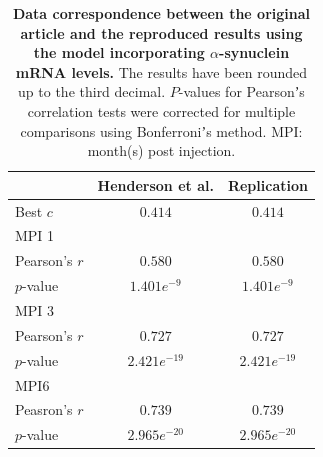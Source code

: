 \begin{table}[h]
  \begin{center}
    \centering
   
    \begin{tabular}{|l|c|c|} %
      \hline
      
      &\textbf{Henderson et al.} & \textbf{Replication} \hspace{1cm}\\

      \hline
      Best $c$ & $0.414$ & $0.414$ \\
      MPI 1 & &\\
            \hspace{1cm} Pearson's $r$ & $0.580$ & $0.580$\\
            \hspace{1cm} $p$-value & $1.401e^{-9}$ & $1.401e^{-9}$ \\ 

      MPI 3 & &\\
            \hspace{1cm} Pearson's $r$ & $0.727$ & $0.727$ \\
            \hspace{1cm} $p$-value & $2.421e^{-19}$ & $2.421e^{-19}$   \\
            
      MPI6& &\\
            \hspace{1cm} Peasron's $r$ & $0.739$ & $0.739$ \\
            \hspace{1cm} $p$-value & $2.965e^{-20}$ & $2.965e^{-20}$  \\
      \hline
    \end{tabular}
    
    \caption{\textbf{Data correspondence between the original article and the reproduced results using the model incorporating $\alpha$-synuclein mRNA levels.} The results have been rounded up to the third decimal. $P$-values for Pearsonʼs correlation tests were corrected for multiple comparisons using Bonferroniʼs method. MPI: month(s) post injection.}
  \end{center}
\end{table}


